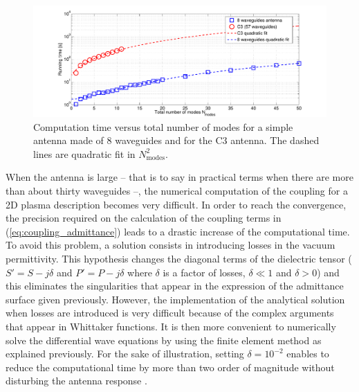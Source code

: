 %
\begin{figure}[h]
	\includegraphics[width=1.0\textwidth]{figures/chap2/ALOHA/figure5}
	\caption{Computation time versus total number of modes for a simple antenna
		made of 8 waveguides and for the C3 antenna. The dashed lines are
		quadratic fit in $N_{\mbox{modes}}^{2}$. \label{fig:Computation-time-versus-modes}}
\end{figure}


When the antenna is large -- that is to say in practical terms when there are more than about thirty waveguides --, the numerical computation of the coupling for a 2D plasma description becomes very difficult. In order to reach the convergence, the precision required on the calculation of the coupling terms in (\ref{eq:coupling_admittance}) leads to a drastic increase of the computational time. To avoid this problem, a solution consists in introducing losses in the vacuum permittivity. This hypothesis changes the diagonal terms of the dielectric tensor ($S'=S-j\delta$ and $P'=P-j\delta$ where $\delta$ is a factor of losses, $\delta\ll1$ and $\delta>0$) and this eliminates the singularities that appear in the expression of the admittance surface given previously. However, the implementation of the analytical solution when losses are introduced is very difficult because of the complex arguments that appear in Whittaker functions. It is then more convenient to numerically solve the differential wave equations by using the finite element method as explained previously. For the sake of illustration, setting $\delta=10^{-2}$ enables to reduce the computational time by more than two order of magnitude without disturbing the antenna response .



